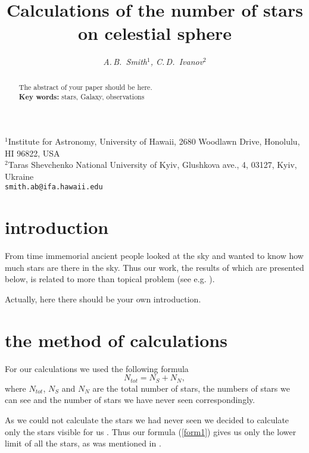 \documentclass[a4paper]{article}
\begin{document}
\fontsize{11}{11}\selectfont %
\title{Calculations of the number of stars on celestial sphere}
\author{\textsl{A.\,B.~Smith$^{1}$, C.\,D.~Ivanov$^{2}$}}
\date{\vspace*{-6ex}}
\maketitle
\begin{center} {\small $^{1}$Institute for Astronomy, University of Hawaii, 2680 Woodlawn Drive, Honolulu, HI 96822, USA\\
$^{2}$Taras Shevchenko National University of Kyiv, Glushkova ave., 4, 03127, Kyiv, Ukraine\\
{\tt smith.ab@ifa.hawaii.edu}}
\end{center}

\begin{abstract}
The abstract of your paper should be here.\\[1ex]
{\bf Key words:} stars, Galaxy, observations
\end{abstract}

\section*{\sc introduction}
\indent \indent From time immemorial ancient people looked at the sky and wanted to know how much stars are there in the sky. Thus our work, the results of which are presented below, is related to more than topical problem (see e.g. \cite{bean76}).

Actually, here there should be your own introduction.

\section*{\sc the method of calculations}

\indent \indent For our calculations we used the following formula 
\begin{equation}\label{form1}
N_{tot}=N_{S}+N_{N},
\end{equation}
where $N_{tot}$, $N_{S}$ and $N_{N}$ are the total number of stars, the numbers of stars we can see and the number of stars we have never seen correspondingly.

As we could not calculate the stars we had never seen we decided to calculate only the stars visible for us \cite{onion07}. Thus our formula (\ref{form1}) gives us only the lower limit of all the stars, as was mentioned in \cite{carrot89}.
\end{document}
